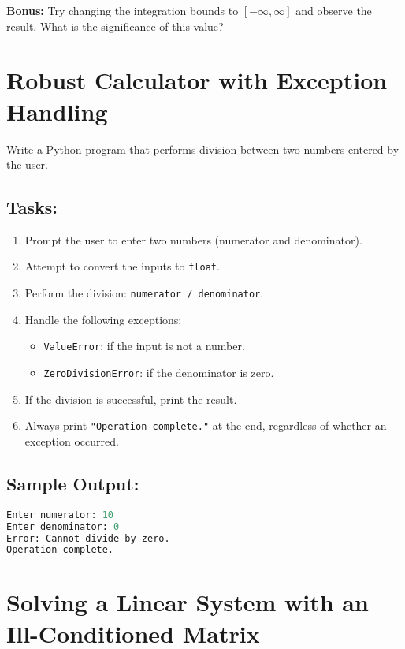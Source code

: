 \documentclass[11pt]{article}
\begin{document}
\noindent\textbf{Bonus:} Try changing the integration bounds to \( [-\infty, \infty] \) and observe the result. What is the significance of this value?





\section*{Robust Calculator with Exception Handling}

Write a Python program that performs division between two numbers entered by the user.
\subsection*{Tasks:}
\begin{enumerate}
\item Prompt the user to enter two numbers (numerator and denominator).
\item Attempt to convert the inputs to \texttt{float}.
\item Perform the division: \texttt{numerator / denominator}.
\item Handle the following exceptions:
\begin{itemize}
    \item \texttt{ValueError}: if the input is not a number.
    \item \texttt{ZeroDivisionError}: if the denominator is zero.
\end{itemize}
\item If the division is successful, print the result.
\item Always print \texttt{"Operation complete."} at the end, regardless of whether an exception occurred.
\end{enumerate}

\subsection*{Sample Output:}
\begin{lstlisting}[language=python]
Enter numerator: 10
Enter denominator: 0
Error: Cannot divide by zero.
Operation complete.
\end{lstlisting}



\section*{Solving a Linear System with an Ill-Conditioned Matrix}
\end{document}
